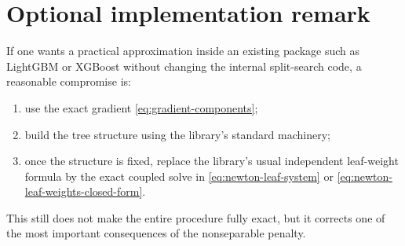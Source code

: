 \documentclass[11pt]{article}
\newcommand{\1}{\mathbf{1}}
\begin{document}
\section{Optional implementation remark}

If one wants a practical approximation inside an existing package such as LightGBM or XGBoost without changing the internal split-search code, a reasonable compromise is:
\begin{enumerate}[leftmargin=2em]
\item use the exact gradient \eqref{eq:gradient-components};
\item build the tree structure using the library's standard machinery;
\item once the structure is fixed, replace the library's usual independent leaf-weight formula by the exact coupled solve in \eqref{eq:newton-leaf-system} or \eqref{eq:newton-leaf-weights-closed-form}.
\end{enumerate}
This still does not make the entire procedure fully exact, but it corrects one of the most important consequences of the nonseparable penalty.
\end{document}
